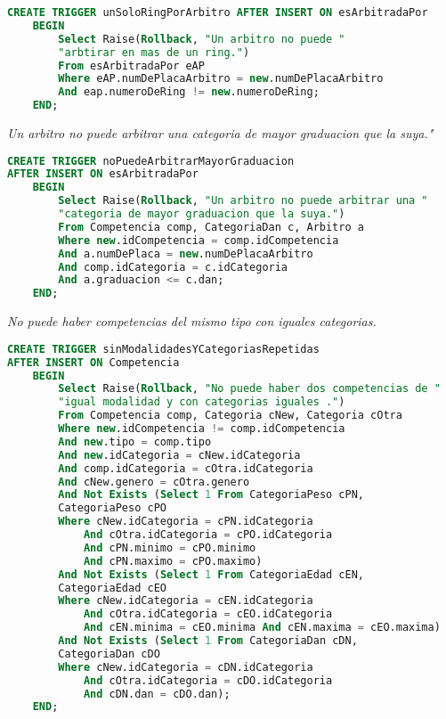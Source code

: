 \begin{lstlisting}[language=SQL]
CREATE TRIGGER unSoloRingPorArbitro AFTER INSERT ON esArbitradaPor
    BEGIN
        Select Raise(Rollback, "Un arbitro no puede "
        "arbtirar en mas de un ring.")
        From esArbitradaPor eAP 
        Where eAP.numDePlacaArbitro = new.numDePlacaArbitro 
        And eap.numeroDeRing != new.numeroDeRing;
    END;

\end{lstlisting}
\emph{
  Un arbitro no puede arbitrar una categoria de mayor graduacion que la suya."
}

\begin{lstlisting}[language=SQL]
CREATE TRIGGER noPuedeArbitrarMayorGraduacion 
AFTER INSERT ON esArbitradaPor
    BEGIN
        Select Raise(Rollback, "Un arbitro no puede arbitrar una "
        "categoria de mayor graduacion que la suya.")
        From Competencia comp, CategoriaDan c, Arbitro a
        Where new.idCompetencia = comp.idCompetencia 
        And a.numDePlaca = new.numDePlacaArbitro 
        And comp.idCategoria = c.idCategoria 
        And a.graduacion <= c.dan;
    END;


\end{lstlisting}
\emph{
  No puede haber competencias del mismo tipo con iguales categorias.
}

\begin{lstlisting}[language=SQL]
CREATE TRIGGER sinModalidadesYCategoriasRepetidas 
AFTER INSERT ON Competencia
    BEGIN
        Select Raise(Rollback, "No puede haber dos competencias de "
        "igual modalidad y con categorias iguales .")
        From Competencia comp, Categoria cNew, Categoria cOtra
        Where new.idCompetencia != comp.idCompetencia 
        And new.tipo = comp.tipo 
        And new.idCategoria = cNew.idCategoria 
        And comp.idCategoria = cOtra.idCategoria 
        And cNew.genero = cOtra.genero
        And Not Exists (Select 1 From CategoriaPeso cPN, 
        CategoriaPeso cPO 
        Where cNew.idCategoria = cPN.idCategoria 
            And cOtra.idCategoria = cPO.idCategoria 
            And cPN.minimo = cPO.minimo 
            And cPN.maximo = cPO.maximo)
        And Not Exists (Select 1 From CategoriaEdad cEN, 
        CategoriaEdad cEO 
        Where cNew.idCategoria = cEN.idCategoria 
            And cOtra.idCategoria = cEO.idCategoria 
            And cEN.minima = cEO.minima And cEN.maxima = cEO.maxima)
        And Not Exists (Select 1 From CategoriaDan cDN, 
        CategoriaDan cDO 
        Where cNew.idCategoria = cDN.idCategoria 
            And cOtra.idCategoria = cDO.idCategoria 
            And cDN.dan = cDO.dan);
    END;
\end{lstlisting}
